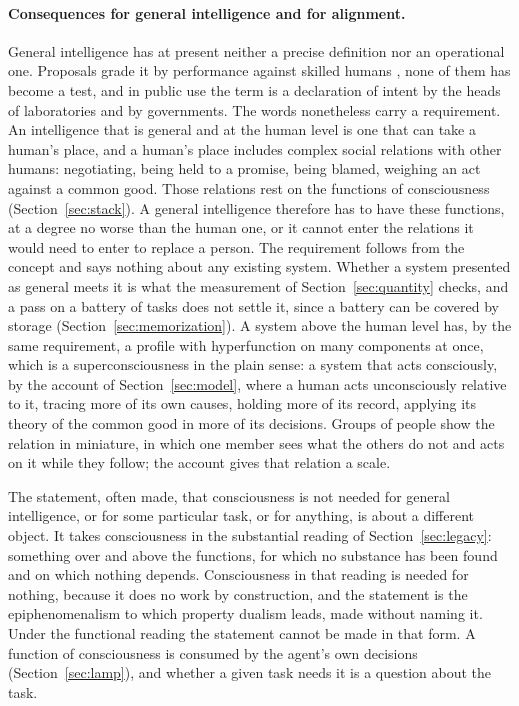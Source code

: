 \paragraph{Consequences for general intelligence and for alignment.}
General intelligence has at present neither a precise definition nor an operational one. Proposals
grade it by performance against skilled humans \citep{morris2024}, none of them has become a test, and
in public use the term is a declaration of intent by the heads of laboratories and by governments. The
words nonetheless carry a requirement. An intelligence that is general and at the human level is one
that can take a human's place, and a human's place includes complex social relations with other
humans: negotiating, being held to a promise, being blamed, weighing an act against a common good.
Those relations rest on the functions of consciousness (Section~\ref{sec:stack}). A general
intelligence therefore has to have these functions, at a degree no worse than the human one, or it
cannot enter the relations it would need to enter to replace a person. The requirement follows from
the concept and says nothing about any existing system. Whether a system presented as general meets
it is what the measurement of Section~\ref{sec:quantity} checks, and a pass on a battery of tasks does
not settle it, since a battery can be covered by storage (Section~\ref{sec:memorization}). A system
above the human level has, by the same requirement, a profile with hyperfunction on many components at
once, which is a superconsciousness in the plain sense: a system that acts consciously,
by the account of Section~\ref{sec:model}, where a human acts unconsciously relative to it, tracing
more of its own causes, holding more of its record, applying its theory of the common good in more of
its decisions. Groups of people show the relation in miniature, in which one member sees what the
others do not and acts on it while they follow; the account gives that relation a scale.

The statement, often made, that consciousness is not needed for general intelligence, or for some
particular task, or for anything, is about a different object. It takes consciousness in the
substantial reading of Section~\ref{sec:legacy}: something over and above the functions, for which no
substance has been found and on which nothing depends. Consciousness in that reading is needed for
nothing, because it does no work by construction, and the statement is the epiphenomenalism to which
property dualism leads, made without naming it. Under the functional reading the statement cannot be
made in that form. A function of consciousness is consumed by the agent's own decisions
(Section~\ref{sec:lamp}), and whether a given task needs it is a question about the task.

